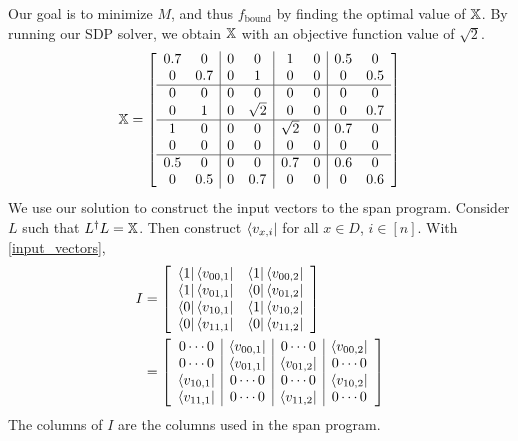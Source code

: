 Our goal is to minimize $M$, 
and thus $f_{\text{bound}}$ by 
finding the optimal value of $\operatorname{\mathbb{X}}$. 
By running our SDP solver, we obtain 
$\operatorname{\mathbb{X}}$ with an objective function value of $\sqrt{2}$.
\begin{align}
    \operatorname{\mathbb{X}} = \left[ \begin{array}{cc|cc|cc|cc}
    0.7 & 0 & 0 & 0 & 1 & 0 & 0.5 & 0\\
    0 & 0.7 & 0 & 1 & 0 & 0 & 0 & 0.5\\
    \hline
    0 & 0 & 0 & 0 & 0 & 0 & 0 & 0\\
    0 & 1 & 0 & \sqrt{2} & 0 & 0 & 0 & 0.7\\
    \hline
    1 & 0 & 0 & 0 & \sqrt{2} & 0 & 0.7 & 0\\
    0 & 0 & 0 & 0 & 0 & 0 & 0 & 0\\
    \hline
    0.5 & 0 & 0 & 0 & 0.7 & 0 & 0.6 & 0\\
    0 & 0.5 & 0 & 0.7 & 0 & 0 & 0 & 0.6\\
    \end{array}
\right] \nonumber
\end{align}
We use our solution to construct the input
vectors to the span program.
Consider $L$ such that $L^\dagger L = \operatorname{\mathbb{X}}$.
Then construct $\bra{v_{x,i}}$
for all $x \in D$, $i \in [n]$.
With \cref{input_vectors},
\begin{align}
I &= \left[\begin{array}{cc}
    \bra{1}\bra{v_{00,1}} & \bra{1}\bra{v_{00,2}} \\
    \bra{1}\bra{v_{01,1}} & \bra{0}\bra{v_{01,2}} \\
    \bra{0}\bra{v_{10,1}} & \bra{1}\bra{v_{10,2}}\\
    \bra{0}\bra{v_{11,1}} & \bra{0}\bra{v_{11,2}}\\
\end{array} \right] \nonumber \\
&= \left[\begin{array}{c|c|c|c}
    0 \cdots 0 & \bra{v_{00,1}} & 0 \cdots 0 & \bra{v_{00,2}} \\
    0 \cdots 0 & \bra{v_{01,1}} & \bra{v_{01,2}} & 0 \cdots 0\\
    \bra{v_{10,1}} & 0 \cdots 0 & 0 \cdots 0 & \bra{v_{10,2}}\\
    \bra{v_{11,1}} & 0 \cdots 0 & \bra{v_{11,2}} & 0 \cdots 0\\
\end{array} \right] \nonumber
\end{align}
The columns of $I$ are the columns
used in the span program. 
